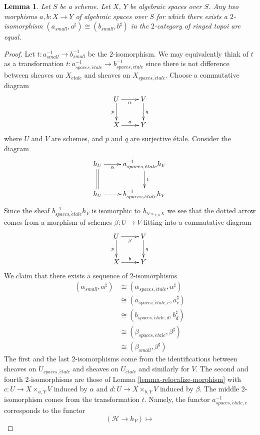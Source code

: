\documentclass{stacks-project}
\theoremstyle{plain}
\newtheorem{lemma}[subsection]{Lemma}
\theoremstyle{definition}
\theoremstyle{remark}
\numberwithin{equation}{subsection}
\def\etale{{\acute{e}tale}}
\begin{document}
\begin{lemma}
\label{lemma-faithful}
Let $S$ be a scheme.
Let $X$, $Y$ be algebraic spaces over $S$.
Any two morphisms $a, b : X \to Y$ of algebraic spaces over $S$
for which there exists a $2$-isomorphism
$(a_{small}, a^\sharp) \cong (b_{small}, b^\sharp)$
in the $2$-category of ringed topoi are equal.
\end{lemma}

\begin{proof}
Let $t : a_{small}^{-1} \to b_{small}^{-1}$ be the $2$-isomorphism.
We may equivalently think of $t$ as a transformation
$t : a_{spaces, \etale}^{-1} \to b_{spaces, \etale}^{-1}$
since there is not difference between sheaves on $X_\etale$
and sheaves on $X_{spaces, \etale}$.
Choose a commutative diagram
$$
\xymatrix{
U \ar[d]_p \ar[r]_\alpha  & V \ar[d]^q \\
X \ar[r]^a & Y
}
$$
where $U$ and $V$ are schemes, and $p$ and $q$ are surjective \'etale.
Consider the diagram
$$
\xymatrix{
h_U \ar[r]_-\alpha \ar@{=}[d] & a_{spaces, \etale}^{-1}h_V \ar[d]^t \\
h_U \ar@{..>}[r] & b_{spaces, \etale}^{-1}h_V
}
$$
Since the sheaf $b_{spaces, \etale}^{-1}h_V$ is isomorphic to
$h_{V \times_{Y, b} X}$ we see that the dotted arrow comes from a
morphism of schemes
$\beta : U \to V$ fitting into a commutative diagram
$$
\xymatrix{
U \ar[d]_p \ar[r]_\beta  & V \ar[d]^q \\
X \ar[r]^b & Y
}
$$
We claim that there exists a sequence of $2$-isomorphisms
\begin{align*}
(\alpha_{small}, \alpha^\sharp)
& \cong
(\alpha_{spaces, \etale}, \alpha^\sharp) \\
& \cong
(a_{spaces, \etale, c}, a_c^\sharp) \\
& \cong
(b_{spaces, \etale, d}, b_d^\sharp) \\
& \cong
(\beta_{spaces, \etale}, \beta^\sharp) \\
& \cong
(\beta_{small}, \beta^\sharp)
\end{align*}
The first and the last $2$-isomorphisms come from the identifications
between sheaves on $U_{spaces, \etale}$ and sheaves on
$U_\etale$ and similarly for $V$. The second and fourth
$2$-isomorphisms are those of
Lemma \ref{lemma-relocalize-morphism}
with $c : U \to X \times_{a, Y} V$ induced by $\alpha$ and
$d : U \to X \times_{b, Y} V$ induced by $\beta$.
The middle $2$-isomorphism comes from the transformation $t$.
Namely, the functor $a_{spaces, \etale, c}^{-1}$ corresponds
to the functor
$$
(\mathcal{H} \to h_V) \longmapsto
$$
\end{proof}
\end{document}
